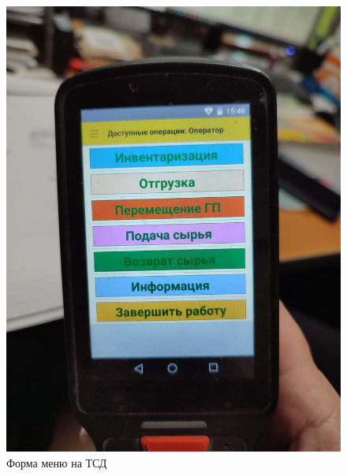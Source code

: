\begin{figure}
\begin{center}
  \includegraphics[height=0.94\textheight, width=\textwidth, keepaspectratio]{Pics/d_TSD_1.JPEG}
\end{center}
  \caption{Форма меню на ТСД}
  \label{pic:d_TSD_1}
\end{figure}


